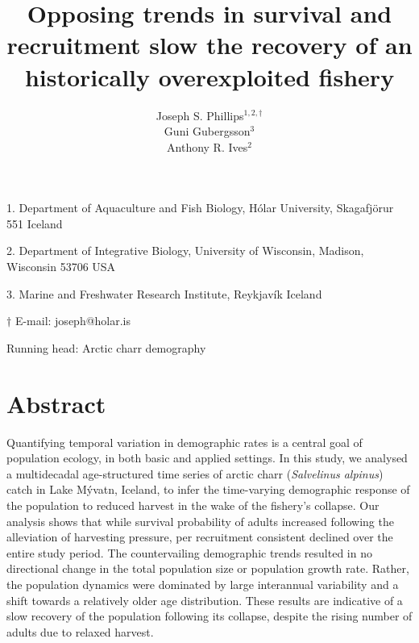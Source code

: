 \documentclass[11pt]{article}
\title{Opposing trends in survival and recruitment slow the recovery 
        of an historically overexploited fishery}
\author{
Joseph S. Phillips$^{1,2, \dagger}$ \\
Gu{\dh}ni Gu{\dh}bergsson$^{3}$ \\
Anthony R. Ives$^{2}$
}
\date{}
\begin{document}
\raggedright
\setlength\parindent{0.25in}

\maketitle


\noindent{} 1. Department of Aquaculture and Fish Biology, 
H\'{o}lar University, Skagafj\"{o}r{\dh}ur 551 Iceland

\noindent{} 2. Department of Integrative Biology, 
University of Wisconsin, Madison, Wisconsin 53706 USA

\noindent{} 3. Marine and Freshwater Research Institute, Reykjav\'{i}k Iceland

\noindent{} $\dagger$ E-mail: joseph@holar.is



\bigskip

Running head: {Arctic charr demography}

\linenumbers{}

\clearpage






\section*{Abstract} \label{abstract}

Quantifying temporal variation in demographic rates is a central goal of population ecology,
in both basic and applied settings.
In this study, we analysed a multidecadal age-structured time series 
of arctic charr (\emph{Salvelinus alpinus}) catch  in Lake M\'{y}vatn, Iceland, 
to infer the time-varying demographic response of the population 
to reduced harvest in the wake of the fishery's collapse.
Our analysis shows that while survival probability of adults increased following the alleviation
of harvesting pressure, per recruitment consistent declined over the entire study period.
The countervailing demographic trends resulted 
in no directional change in the total population size or population growth rate.
Rather, the population dynamics were dominated by large interannual variability
and a shift towards a relatively older age distribution.
These results are indicative of a slow recovery of the population following its collapse,
despite the rising number of adults due to relaxed harvest.
\end{document}
